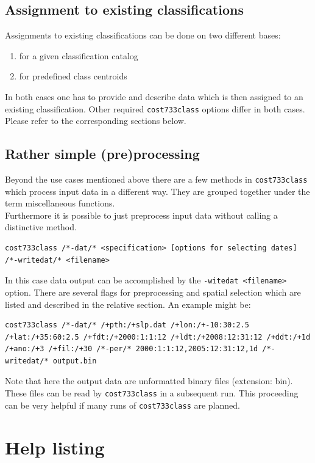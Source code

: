 \documentclass[12pt, oneside, a4paper, headsepline, plainheadsepline]{scrbook}
\begin{document}
\subsection{Assignment to existing classifications}
Assignments to existing classifications can be done on two different bases:
\begin{enumerate}
  \item for a given classification catalog
  \item for predefined class centroids
\end{enumerate}
In both cases one has to provide and describe data which is then assigned to an existing classification. Other required \verb+cost733class+ options differ in both cases. Please refer to the corresponding sections below.

\subsection{Rather simple (pre)processing}
Beyond the use cases mentioned above there are a few methods in \verb+cost733class+ which process input data in a different way. 
They are grouped together under the term miscellaneous functions.\\
Furthermore it is possible to just preprocess input data without calling a distinctive method.
\begin{lstlisting}
cost733class /*-dat/* <specification> [options for selecting dates] /*-writedat/* <filename>
\end{lstlisting}
In this case data output can be accomplished by the \verb+-witedat <filename>+ option. There are several flags for preprocessing and spatial selection which are listed and described in the relative section. An example might be:
\begin{lstlisting}
cost733class /*-dat/* /+pth:/+slp.dat /+lon:/+-10:30:2.5  /+lat:/+35:60:2.5 /+fdt:/+2000:1:1:12 /+ldt:/+2008:12:31:12 /+ddt:/+1d /+ano:/+3 /+fil:/+30 /*-per/* 2000:1:1:12,2005:12:31:12,1d /*-writedat/* output.bin
\end{lstlisting}
Note that here the output data are unformatted binary files (extension: bin). These files can be read by \verb+cost733class+ in a subsequent run. This proceeding can be very helpful if many runs of  \verb+cost733class+ are planned.

\section{Help listing}
\end{document}
